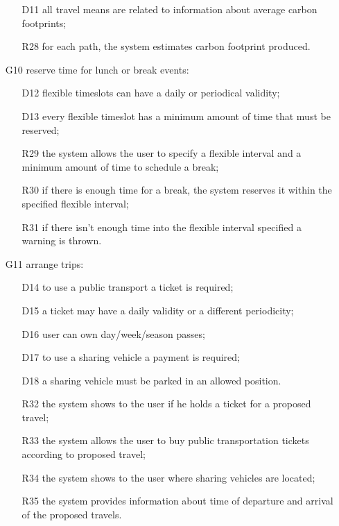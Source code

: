 \begin{itemize}
	\begin{itemize}
	\item[D11] all travel means are related to information about average carbon footprints; 
	\newline
	\item[R28] for each path, the system estimates carbon footprint produced.
	\end{itemize}
\item[G10] reserve time for lunch or break events:
	\begin{itemize}
	\item[D12] flexible timeslots can have a daily or periodical validity;
	\item[D13] every flexible timeslot has a minimum amount of time that must be reserved;
	\newline
	\item[R29] the system allows the user to specify a flexible interval and a minimum amount of time to schedule a break;
	\item[R30] if there is enough time for a break, the system reserves it within the specified flexible interval;
	\item[R31] if there isn’t enough time into the flexible interval specified a warning is thrown.
	\end{itemize}
\item[G11] arrange trips:
	\begin{itemize}
	\item[D14] to use a public transport a ticket is required; 
	\item[D15] a ticket may have a daily validity or a different periodicity; 
	\item[D16] user can own day/week/season passes;
	\item[D17] to use a sharing vehicle a payment is required;
	\item[D18] a sharing vehicle must be parked in an allowed position.
	\newline
	\item[R32] the system shows to the user if he holds a ticket for a proposed travel;
	\item[R33] the system allows the user to buy public transportation tickets according to proposed travel;
	\item[R34] the system shows to the user where sharing vehicles are located;
	\item[R35] the system provides information about time of departure and arrival of the proposed travels.
	\end{itemize}
\end{itemize}